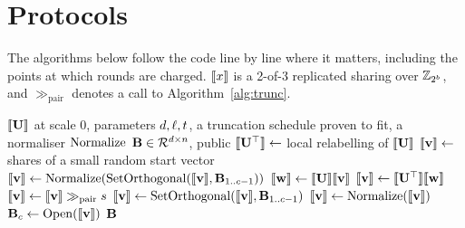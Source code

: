 \section{Protocols}
\label{app:protocols}

The algorithms below follow the code line by line where it matters, including
the points at which rounds are charged. $\llbracket x \rrbracket$ is a 2-of-3 replicated sharing
over $\mathbb{Z}_{2^{b}}$, and $\gg_{\mathrm{pair}}$ denotes a call to
Algorithm~\ref{alg:trunc}.

\begin{algorithm}[h]
\caption{$\ApproxFactor$ under sharing (\texttt{src/mf/factor.cpp}).}
\label{alg:factor}
\begin{algorithmic}[1]
\Require $\llbracket \mathbf{U} \rrbracket$ at scale 0, parameters $d, \ell, t$, a
  truncation schedule proven to fit, a normaliser $\operatorname{Normalize}$
\Ensure $\mathbf{B} \in \mathcal{R}^{d \times n}$, public
\State $\llbracket \mathbf{U}^{\top} \rrbracket \gets$ local relabelling of $\llbracket \mathbf{U} \rrbracket$
  \State $\llbracket \mathbf{v} \rrbracket \gets$ shares of a small random start vector
  \State $\llbracket \mathbf{v} \rrbracket \gets \operatorname{Normalize}(\operatorname{SetOrthogonal}(\llbracket \mathbf{v} \rrbracket,
    \mathbf{B}_{1..c-1}))$
    \State $\llbracket \mathbf{w} \rrbracket \gets \llbracket \mathbf{U} \rrbracket\llbracket \mathbf{v} \rrbracket$
    \State $\llbracket \mathbf{v} \rrbracket \gets \llbracket \mathbf{U}^{\top} \rrbracket\llbracket \mathbf{w} \rrbracket$
    \State $\llbracket \mathbf{v} \rrbracket \gets \llbracket \mathbf{v} \rrbracket \gg_{\mathrm{pair}} s$
    \State $\llbracket \mathbf{v} \rrbracket \gets \operatorname{SetOrthogonal}(\llbracket \mathbf{v} \rrbracket,
      \mathbf{B}_{1..c-1})$ 
    \State $\llbracket \mathbf{v} \rrbracket \gets \operatorname{Normalize}(\llbracket \mathbf{v} \rrbracket)$
  \EndFor
  \State $\mathbf{B}_c \gets \mathrm{Open}(\llbracket \mathbf{v} \rrbracket)$
\EndFor
\State \Return $\mathbf{B}$ 
\end{algorithmic}
\end{algorithm}

